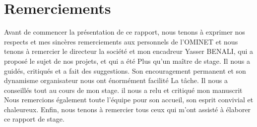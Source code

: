 
\chapter*{Remerciements}

Avant de commencer la présentation de ce rapport, nous tenons à exprimer nos  respects et
mes sincères remerciements aux personnels de l'OMINET et nous tenons à remercier le directeur
la société et mon encadreur Yasser BENALI, qui a proposé le sujet de nos projets, et qui a été
Plus qu’un maître de stage. Il  nous a guidés, critiqués et a fait des suggestions.
Son encouragement permanent et son dynamisme organisateur nous ont énormément facilité
La tâche. Il nous a conseillés tout au cours de mon stage. il nous a relu et critiqué mon manuscrit
Nous remercions également toute l’équipe pour son accueil, son esprit convivial et chaleureux.
Enfin, nous tenons à remercier tous ceux qui m’ont assisté à élaborer ce rapport de stage.
